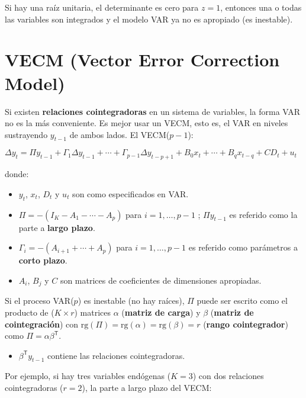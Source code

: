 \documentclass[10pt, a4paper, landscape]{extarticle}
\newcommand{\tr}{\mathsf{T}}
\newcommand{\rk}{\mathrm{rg}}
\begin{document}
\begin{multicols}{2}
Si hay una raíz unitaria, el determinante es cero para $z=1$, entonces una o todas las variables son integrados y el modelo VAR ya no es apropiado (es inestable).

\columnbreak

\section*{VECM (Vector Error Correction Model)}

Si existen \textbf{relaciones cointegradoras} en un sistema de variables, la forma VAR no es la más conveniente. Es mejor usar un VECM, esto es, el VAR en niveles sustrayendo $y_{t-1}$ de ambos lados. El VECM($p - 1$):

\begin{center}
	$\Delta y_t = \Pi y_{t - 1} + \Gamma_1 \Delta y_{t - 1} + \cdots + \Gamma_{p - 1} \Delta y_{t - p + 1} + B_0 x_t + \cdots + B_q x_{t - q} + CD_t + u_t$
\end{center}

donde:

\begin{itemize}[leftmargin=*]
	\item $y_t$, $x_t$, $D_t$ y $u_t$ son como especificados en VAR.
	\item $\Pi = - (I_K - A_1 - \cdots - A_p)$ para $i = 1, \ldots, p - 1$ ; $\Pi y_{t - 1}$ es referido como la parte a \textbf{largo plazo}.
	\item $\Gamma_i = - (A_{i + 1} + \cdots + A_p)$ para $i = 1, \ldots, p - 1$ es referido como parámetros a \textbf{corto plazo}.
	\item $A_i$, $B_j$ y $C$ son matrices de coeficientes de dimensiones apropiadas.
\end{itemize}

Si el proceso VAR($p$) es inestable (no hay raíces), $\Pi$ puede ser escrito como el producto de ($K \times r$) matrices $\alpha$ (\textbf{matriz de carga}) y $\beta$ (\textbf{matriz de cointegración}) con $\rk(\Pi) = \rk(\alpha) = \rk(\beta) = r$ (\textbf{rango cointegrador}) como $\Pi = \alpha \beta^\tr$.

\begin{itemize}[leftmargin=*]
	\item $\beta^\tr y_{t - 1}$ contiene las relaciones cointegradoras.
\end{itemize}

Por ejemplo, si hay tres variables endógenas ($K=3$) con dos relaciones cointegradoras ($r=2$), la parte a largo plazo del VECM:


\end{multicols}
\end{document}

